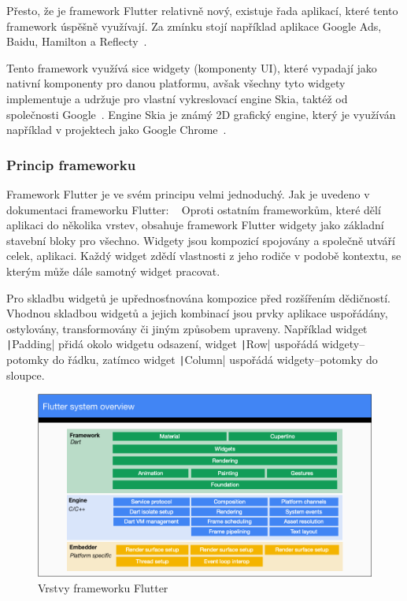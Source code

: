Přesto,
že je framework Flutter relativně nový,
existuje řada aplikací,
které tento framework úspěšně využívají.
Za zmínku stojí například aplikace Google Ads, Baidu, Hamilton a
Reflecty~\cite{flutter}.

Tento framework využívá sice widgety (komponenty UI),
které vypadají jako nativní komponenty pro danou platformu,
avšak všechny tyto widgety implementuje a udržuje pro vlastní vykreslovací
engine Skia,
taktéž od společnosti Google~\cite{flutter}.
Engine Skia je známý 2D grafický engine,
který je využíván například v projektech jako Google Chrome~\cite{skia}.

\subsubsection*{Princip frameworku}

Framework Flutter je ve svém principu velmi jednoduchý.
Jak je uvedeno v dokumentaci frameworku Flutter:
\emph{}~\cite{flutter_technical_overview}
Oproti ostatním frameworkům,
které dělí aplikaci do několika vrstev,
obsahuje framework Flutter widgety jako základní stavební bloky pro všechno.
Widgety jsou kompozicí spojovány a společně utváří celek, aplikaci.
Každý widget zdědí vlastnosti z jeho rodiče v podobě kontextu,
se kterým může dále samotný widget pracovat.~\cite{flutter_technical_overview}

Pro skladbu widgetů je upřednosťnována kompozice před rozšířením dědičností.
Vhodnou skladbou widgetů a jejich kombinací jsou prvky aplikace uspořádány,
ostylovány, transformovány či jiným způsobem upraveny.
Například widget \texttt|Padding| přidá okolo widgetu odsazení,
widget \texttt|Row| uspořádá widgety--potomky do řádku,
zatímco widget \texttt|Column| uspořádá widgety--potomky
do sloupce.~\cite{flutter_technical_overview}

\begin{figure}[ht!]
    \centering
    \includegraphics[width=\linewidth]{assets/technology-research/framework/flutter_overview.png}
    \caption{Vrstvy frameworku Flutter ~\cite{flutter_technical_overview}}
    \label{fig:flutter_layers}
\end{figure}

